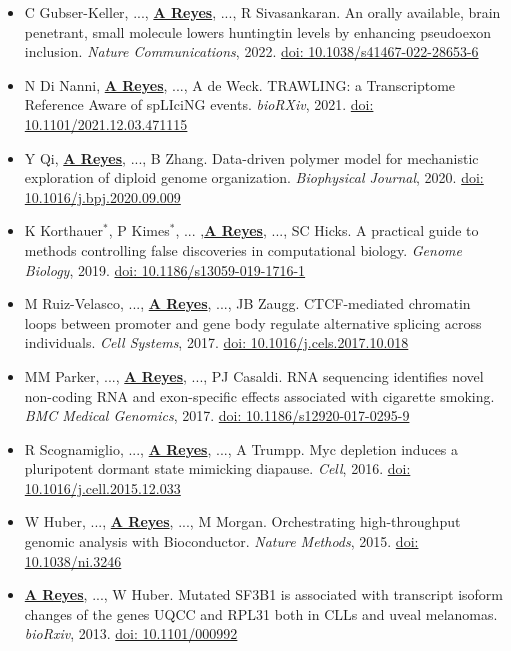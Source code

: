\documentclass[11pt,a4paper,sans]{moderncv} %
\begin{document}
\begin{itemize}
\item C Gubser-Keller, ...,  \textbf{\underline{A Reyes}}, ..., R
  Sivasankaran. An orally available, brain penetrant, small molecule
  lowers huntingtin levels by enhancing pseudoexon
  inclusion. \textit{Nature Communications},
  2022. \href{https://doi.org/10.1038/s41467-022-28653-6}{doi:
    10.1038/s41467-022-28653-6} 
\item N Di Nanni, \textbf{\underline{A Reyes}}, ..., A de
  Weck. TRAWLING: a Transcriptome Reference Aware of spLIciNG
  events. \textit{bioRXiv}, 2021. \href{https://doi.org/10.1101/2021.12.03.471115}{doi:
    10.1101/2021.12.03.471115}
\item Y Qi, \textbf{\underline{A Reyes}}, ..., B Zhang. Data-driven
  polymer model for mechanistic exploration of diploid genome
  organization. \textit{Biophysical Journal}, 2020. \href{https://doi.org/10.1016/j.bpj.2020.09.009}{doi: 10.1016/j.bpj.2020.09.009}
\item K Korthauer$^{\ast}$, P Kimes$^{\ast}$, ... ,\textbf{\underline{A Reyes}}, ..., SC Hicks. A practical guide to
  methods controlling false discoveries in computational
  biology. \textit{Genome Biology}, 2019. \href{https://doi.org/10.1186/s13059-019-1716-1}{doi: 10.1186/s13059-019-1716-1}
\item M Ruiz-Velasco, ..., \textbf{\underline{A Reyes}}, ..., JB Zaugg. CTCF-mediated chromatin loops between promoter and gene body regulate alternative splicing across individuals. \textit{Cell Systems}, 2017. \href{http://dx.doi.org/10.1016/j.cels.2017.10.018}{doi: 10.1016/j.cels.2017.10.018}
\item MM Parker, ..., \textbf{\underline{A Reyes}}, ..., PJ Casaldi. RNA sequencing identifies novel non-coding RNA and exon-specific effects associated with cigarette smoking. \textit{BMC Medical Genomics}, 2017. \href{https://doi.org/10.1186/s12920-017-0295-9}{doi: 10.1186/s12920-017-0295-9}
\item R Scognamiglio, ..., \textbf{\underline{A Reyes}}, ..., A Trumpp. Myc depletion induces a pluripotent dormant state mimicking diapause. \textit{Cell}, 2016. \href{https://doi.org/10.1016/j.cell.2015.12.033}{doi: 10.1016/j.cell.2015.12.033}
\item W Huber, ..., \textbf{\underline{A Reyes}}, ..., M Morgan. Orchestrating high-throughput genomic analysis with Bioconductor. \textit{Nature Methods}, 2015. \href{https://doi.org/10.1038/ni.3246}{doi: 10.1038/ni.3246}
\item \textbf{\underline{A Reyes}}, ..., W Huber. Mutated SF3B1 is associated with transcript isoform changes of the genes UQCC and RPL31 both in CLLs and uveal melanomas. \textit{bioRxiv}, 2013. \href{https://doi.org/10.1101/000992}{doi: 10.1101/000992}

\end{itemize}
\end{document}

